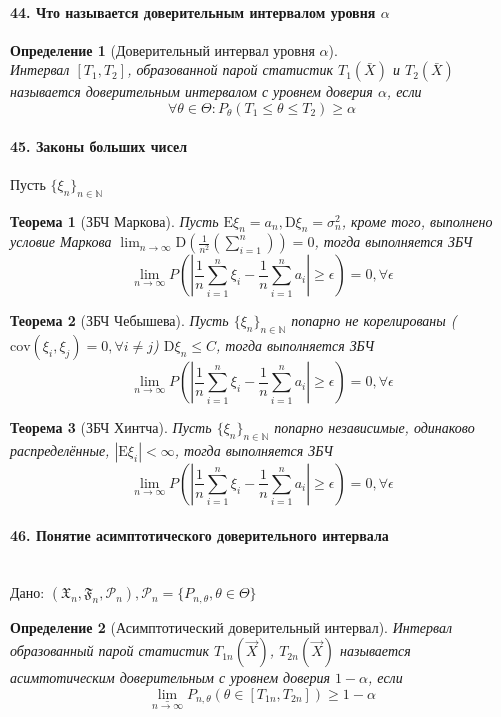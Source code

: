 \documentclass[titlepage]{article}
\newcommand{\sP}{\mathcal{P}}
\newcommand{\sF}{\mathfrak{F}}
\newcommand{\sX}{\mathfrak{X}}
\newcommand{\sE}{\mathrm{E}}
\newcommand{\sD}{\mathrm{D}}
\newtheorem{theorem}{Теорема}
\newtheorem{definition}{Определение}
\begin{document}
\paragraph{44. Что называется доверительным интервалом уровня $\alpha$}
\begin{definition}[Доверительный интервал уровня $\alpha$] ~\\
	Интервал $[T_1,T_2]$, образованной парой статистик $T_1(\bar X)$ и $T_2(\bar X)$ называется доверительным интервалом с уровнем доверия $\alpha$, если
	\[\forall \theta \in \Theta: P_\theta(T_1 \leq \theta \leq T_2) \geq \alpha\]
\end{definition}

\paragraph{45. Законы больших чисел}
Пусть $\{\xi_n\}_{n\in\mathbb{N}}$
\begin{theorem}[ЗБЧ Маркова]
	Пусть $\sE\xi_n=a_n,\sD\xi_n=\sigma_n^2$, кроме того, выполнено условие Маркова ${\lim_{n\rightarrow\infty}\sD(\frac{1}{n^2}(\sum_{i=1}^n)) = 0}$, тогда выполняется ЗБЧ
	$$\lim_{n\rightarrow\infty}P(|\frac{1}{n}\sum_{i=1}^n \xi_i - \frac{1}{n}\sum_{i=1}^n a_i|\geq\epsilon) = 0, \forall \epsilon$$
\end{theorem}

\begin{theorem}[ЗБЧ Чебышева]
	Пусть $\{\xi_n\}_{n\in\mathbb{N}}$ попарно не корелированы ($\text{cov}(\xi_i,\xi_j)=0,\forall i \neq j$)
	$\sD\xi_n \leq C$, тогда выполняется ЗБЧ
	$$\lim_{n\rightarrow\infty}P(|\frac{1}{n}\sum_{i=1}^n \xi_i - \frac{1}{n}\sum_{i=1}^n a_i|\geq\epsilon) = 0, \forall \epsilon$$
\end{theorem}

\begin{theorem}[ЗБЧ Хинтча]
	Пусть $\{\xi_n\}_{n\in\mathbb{N}}$ попарно независимые, одинаково распределённые, $|\sE\xi_i|<\infty$, тогда выполняется ЗБЧ
	$$\lim_{n\rightarrow\infty}P(|\frac{1}{n}\sum_{i=1}^n \xi_i - \frac{1}{n}\sum_{i=1}^n a_i|\geq\epsilon) = 0, \forall \epsilon$$
\end{theorem}

\paragraph{46. Понятие асимптотического доверительного интервала} ~\\
Дано: $(\sX_n,\sF_n,\sP_n), \sP_n=\{P_{n,\theta},\theta\in\Theta\}$
\begin{definition}[Асимптотический доверительный интервал]
	Интервал образованный парой статистик $T_{1n}(\vec X)$, $T_{2n}(\vec X)$ называется асимтотическим доверительным с уровнем доверия $1 - \alpha$, если
	\[\underset{n\rightarrow\infty}{\underline{\lim}}P_{n,\theta}(\theta \in [T_{1n},T_{2n}])\geq1-\alpha\]
\end{definition}
\end{document}
